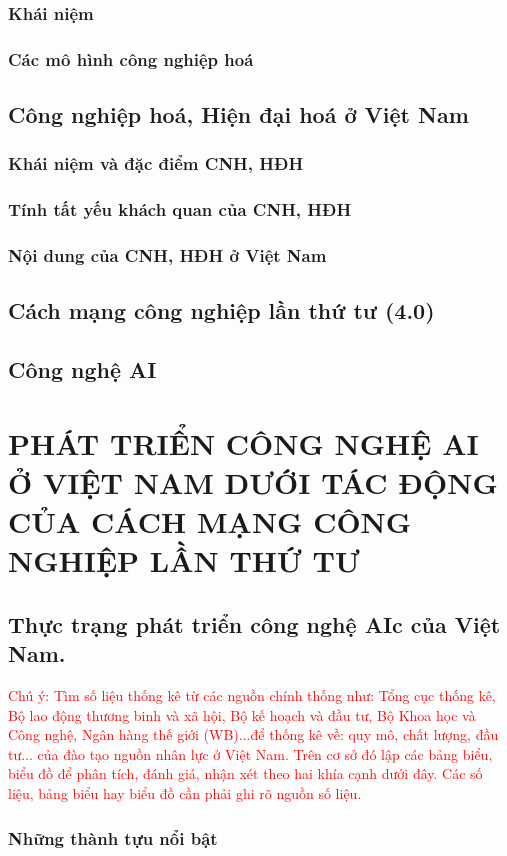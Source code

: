 \documentclass{report}
\begin{document}
\subsection{Khái niệm}
\subsection{Các mô hình công nghiệp hoá}
\section{Công nghiệp hoá, Hiện đại hoá ở Việt Nam}
\subsection{Khái niệm và đặc điểm CNH, HĐH}
\subsection{Tính tất yếu khách quan của CNH, HĐH}
\subsection{Nội dung của CNH, HĐH ở Việt Nam}
\section{Cách mạng công nghiệp lần thứ tư (4.0)}
\section{Công nghệ AI}
\chapter{PHÁT TRIỂN CÔNG NGHỆ AI Ở VIỆT NAM DƯỚI TÁC ĐỘNG CỦA CÁCH MẠNG CÔNG NGHIỆP LẦN THỨ TƯ}
\section{Thực trạng phát triển công nghệ AIc của Việt Nam.}
\textcolor{red}{Chú ý: Tìm số liệu thống kê từ các nguồn chính thống như: Tổng cục thống kê, Bộ lao động thương binh và xã hội, Bộ kế hoạch và đầu tư, Bộ Khoa học và Công nghệ, Ngân hàng thế giới (WB)...để thống kê về: quy mô, chất lượng, đầu tư... của đào tạo nguồn nhân lực ở Việt Nam. Trên cơ sở đó lập các bảng biểu, biểu đồ để phân tích, đánh giá, nhận xét theo hai khía cạnh dưới đây. Các số liệu, bảng biểu hay biểu đồ cần phải ghi rõ nguồn số liệu.}
\subsection{Những thành tựu nổi bật}
\end{document}
